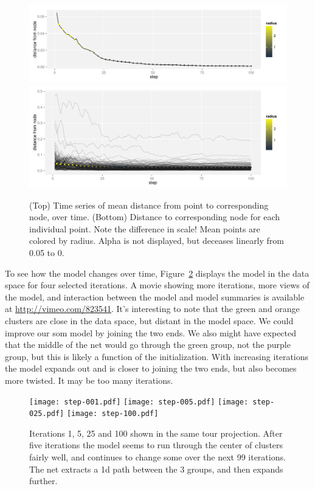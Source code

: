 \documentclass[preprint]{imsart}
\begin{document}
\begin{figure}[htbp]
  \centering
    \includegraphics[width=5in]{som-dist-mean}
    \includegraphics[width=5in]{som-dist}
  \caption{(Top) Time series of mean distance from point to corresponding node, over time.  (Bottom) Distance to corresponding node for each individual point.  Note the difference in scale!  Mean points are colored by radius.  Alpha is not displayed, but deceases linearly from 0.05 to 0.}
  \label{fig:som-dist}
\end{figure}

To see how the model changes over time, Figure~\ref{fig:iteration} displays the model in the data space for four selected iterations.  A movie showing more iterations, more views of the model, and interaction between the model and model summaries is available at \url{http://vimeo.com/823541}.  It's interesting to note that the green and orange clusters are close in the data space, but distant in the model space.  We could improve our {\sc som} model by joining the two ends.  We also might have expected that the middle of the net would go through the green group, not the purple group, but this is likely a function of the initialization. With increasing iterations the model expands out and is closer to joining the two ends, but also becomes more twisted. It may be too many iterations.

\begin{figure}[htb]
  \centering
    \texttt{[image: step-001.pdf]}
    \texttt{[image: step-005.pdf]}
    \texttt{[image: step-025.pdf]}
    \texttt{[image: step-100.pdf]}
  \caption{Iterations 1, 5, 25 and 100 shown in the same tour projection.  After five iterations the model seems to run through the center of clusters fairly well, and continues to change some over the next 99 iterations.  The net  extracts a 1d path between the 3 groups, and then expands further. }
  \label{fig:iteration}
\end{figure}
\end{document}
